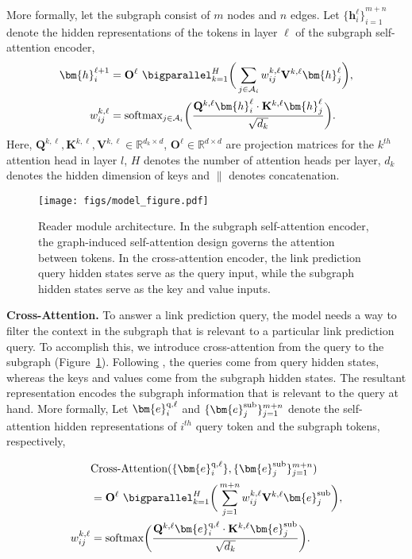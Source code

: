 More formally, let the subgraph consist of $m$ nodes and $n$ edges.
Let ${\{\bm{h}_i^{\ell}\}}_{i=1}^{m+n}$ denote the hidden representations of the tokens in layer $\ell$ of the subgraph self-attention encoder,
\begin{align}
    \bm{h}_{i}^{\ell+1} &= \mathbf{O}^{\ell} \ \bigparallel_{k=1}^{H} \bigg(\sum_{j \in \mathcal{A}_i} w_{ij}^{k,\ell} \mathbf{V}^{k,\ell}\bm{h}_j^{\ell} \bigg),\\
    w_{ij}^{k,\ell} &= \textnormal{softmax}_{j \in \mathcal{A}_i} \bigg( \frac{\mathbf{Q}^{k, \ell} \bm{h}_i^{\ell}\cdot \mathbf{K}^{k, \ell}\bm{h}_j^{\ell}}{\sqrt{d_k}}\bigg).
\end{align}
\noindent Here, $\mathbf{Q}^{k,\ell}, \mathbf{K}^{k,\ell}, \mathbf{V}^{k,\ell} \in \mathbb{R}^{d_k \times d}$, $\mathbf{O}^{\ell} \in \mathbb{R}^{d \times d}$ are projection matrices for the $k^{th}$ attention head in layer $l$, $H$ denotes the number of attention heads per layer, $d_k$ denotes the hidden dimension of keys and $\|$ denotes concatenation.\\

\begin{figure}[htbp]
    \centering
    \texttt{[image: figs/model\_figure.pdf]}
    \caption{Reader module architecture. In the subgraph self-attention encoder, the graph-induced self-attention design governs the attention between tokens. In the cross-attention encoder, the link prediction query hidden states serve as the query input, while the subgraph hidden states serve as the key and value inputs.}
    \label{fig:model_overall}
\end{figure}




\noindent \textbf{Cross-Attention.} To answer a link prediction query, the model needs a way to filter the context in the subgraph that is relevant to a particular link prediction query. To accomplish this, we introduce cross-attention from the query to the subgraph (Figure~\ref{fig:model_overall}). Following \citet{vaswani2017attention}, the queries come from query hidden states, whereas the keys and values come from the subgraph hidden states. The resultant representation encodes the subgraph information that is relevant to the query at hand. 
More formally, Let $\bm{e}^{\textnormal{q}, \ell}_i$ and $\{\bm{e}^{\textnormal{sub}}_j\}_{j=1}^{m+n}$ denote the self-attention hidden representations of $i^{th}$ query token and the subgraph tokens, respectively,

\begin{align}
&\textrm{Cross-Attention}(\{\bm{e}^{\textnormal{q}, \ell}_i\}, \{\bm{e}^{\textnormal{sub}}_j\}_{j=1}^{m+n}) \nonumber\\
&= \mathbf{O}^{\ell} \ \bigparallel_{k=1}^{H} \bigg(\sum_{j=1}^{m+n} w_{ij}^{k,\ell} \mathbf{V}^{k,\ell}\bm{e}_j^{\textnormal{sub}} \bigg),\\
w_{ij}^{k,\ell} &= \textnormal{softmax}\bigg( \frac{\mathbf{Q}^{k, \ell} \bm{e}_i^{\textnormal{q}, \ell}\cdot \mathbf{K}^{k, \ell}\bm{e}_j^{\textnormal{sub}}}{\sqrt{d_k}}\bigg).
\end{align}

